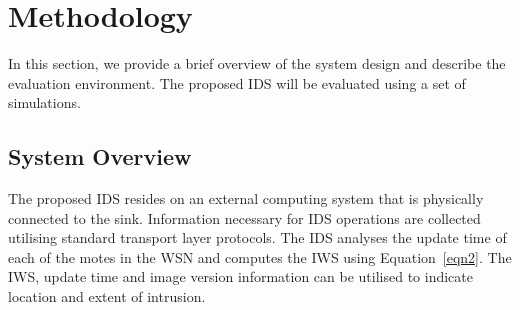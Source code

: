 \documentclass[conference,manuscript]{IEEEtran}
\newcommand{\notedme}[1]{\raisebox{0pt}[0pt][0pt]{\pdfcomment[open=true,color=blue]{#1}}}
\begin{document}
\section{Methodology}
\label{sec:meth}
In this section, we provide a brief overview of the system design and describe the evaluation environment. %
The proposed IDS will be evaluated using a set of simulations. %




\subsection*{System Overview}
\label{subsec:sysdeg}
The proposed IDS resides on an external computing system that is physically connected to the sink.
Information necessary for IDS operations are collected utilising standard transport layer protocols. 
The IDS analyses the update time of  each of the motes in the WSN and computes the IWS using Equation~\ref{eqn2}.
The IWS, update time and image version information can be utilised to indicate location and extent of intrusion. 
\end{document}
